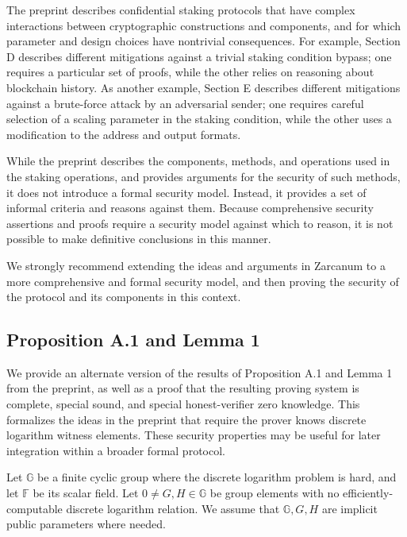 \documentclass{article}
\newcommand{\G}{\mathbb{G}}
\newcommand{\F}{\mathbb{F}}
\begin{document}
The preprint describes confidential staking protocols that have complex interactions between cryptographic constructions and components, and for which parameter and design choices have nontrivial consequences.
For example, Section D describes different mitigations against a trivial staking condition bypass; one requires a particular set of proofs, while the other relies on reasoning about blockchain history.
As another example, Section E describes different mitigations against a brute-force attack by an adversarial sender; one requires careful selection of a scaling parameter in the staking condition, while the other uses a modification to the address and output formats.

While the preprint describes the components, methods, and operations used in the staking operations, and provides arguments for the security of such methods, it does not introduce a formal security model.
Instead, it provides a set of informal criteria and reasons against them.
Because comprehensive security assertions and proofs require a security model against which to reason, it is not possible to make definitive conclusions in this manner.

We strongly recommend extending the ideas and arguments in Zarcanum to a more comprehensive and formal security model, and then proving the security of the protocol and its components in this context.


\subsection{Proposition A.1 and Lemma 1}

We provide an alternate version of the results of Proposition A.1 and Lemma 1 from the preprint, as well as a proof that the resulting proving system is complete, special sound, and special honest-verifier zero knowledge.
This formalizes the ideas in the preprint that require the prover knows discrete logarithm witness elements.
These security properties may be useful for later integration within a broader formal protocol.

Let $\G$ be a finite cyclic group where the discrete logarithm problem is hard, and let $\F$ be its scalar field.
Let $0 \neq G,H \in \G$ be group elements with no efficiently-computable discrete logarithm relation.
We assume that $\G,G,H$ are implicit public parameters where needed.
\end{document}
